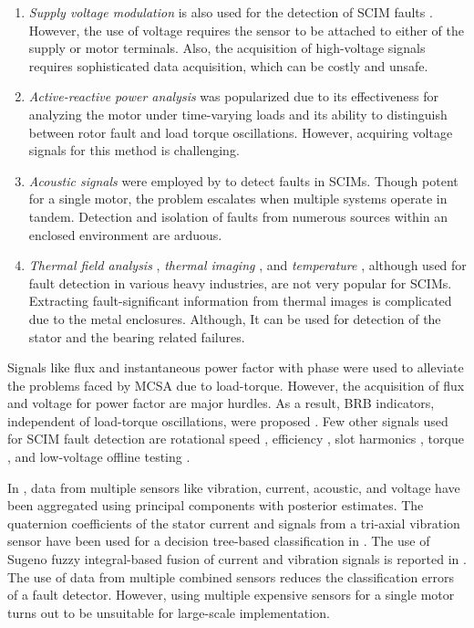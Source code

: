 \begin{enumerate}
%		
		\item \emph{Supply voltage modulation} is also used for the detection of SCIM faults \cite{Nemec2010}. However, the use of voltage requires the sensor to be attached to either of the supply or motor terminals. Also, the acquisition of high-voltage signals requires sophisticated data acquisition, which can be costly and unsafe.
%		
		\item \emph{Active-reactive power analysis} \cite{Cruz2012, Drif2012} was popularized due to its effectiveness for analyzing the motor under time-varying loads and its ability to distinguish between rotor fault and load torque oscillations. However, acquiring voltage signals for this method is challenging.
%		
		\item \emph{Acoustic signals} were employed by \cite{glowacz2019fault, hemamalini2018rational} to detect faults in SCIMs. Though potent for a single motor, the problem escalates when multiple systems operate in tandem. Detection and isolation of faults from numerous sources within an enclosed environment are arduous.
%
		\item \emph{Thermal field analysis} \cite{Ying2010}, \emph{thermal imaging} \cite{osornio2018recent}, and \emph{temperature} \cite{mohammed2018stator}, although used for fault detection in various heavy industries, are not very popular for SCIMs. Extracting fault-significant information from thermal images is complicated due to the metal enclosures. Although, It can be used for detection of the stator and the bearing related failures.
\end{enumerate}

Signals like flux \cite{Cabanas2011} and instantaneous power factor with phase \cite{Drif2012} were used to alleviate the problems faced by MCSA due to load-torque. However, the acquisition of flux and voltage for power factor are major hurdles. As a result, BRB indicators, independent of load-torque oscillations, were proposed \cite{Bruzzese2008, Kim2015, Yang2014}. Few other signals used for SCIM fault detection are rotational speed \cite{Hamadache2015}, efficiency \cite{garcia2018efficiency}, slot harmonics \cite{Khezzar2009}, torque \cite{Gyftakis2013}, and low-voltage offline testing \cite{Kang2015}. 

In \cite{stief2019pca}, data from multiple sensors like vibration, current, acoustic, and voltage have been aggregated using principal components with posterior estimates. The quaternion coefficients of the stator current and signals from a tri-axial vibration sensor have been used for a decision tree-based classification in \cite{contreras2019quaternion}. The use of Sugeno fuzzy integral-based fusion of current and vibration signals is reported in \cite{liu2019fusion}. The use of data from multiple combined sensors reduces the classification errors of a fault detector. However, using multiple expensive sensors for a single motor turns out to be unsuitable for large-scale implementation.

